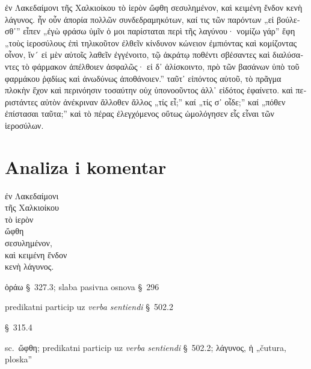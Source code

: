 {\large

\begin{greek}

\noindent ἐν Λακεδαίμονι τῆς Χαλκιοίκου τὸ ἱερὸν ὤφθη σεσυλημένον, καὶ κειμένη ἔνδον κενὴ λάγυνος. ἦν οὖν ἀπορία πολλῶν συνδεδραμηκότων, καί τις τῶν παρόντων „εἰ βούλεσθ᾽” εἶπεν „ἐγὼ φράσω ὑμῖν ὁ μοι παρίσταται περὶ τῆς λαγύνου· νομίζω γάρ” ἔφη „τοὺς ἱεροσύλους ἐπὶ τηλικοῦτον ἐλθεῖν κίνδυνον κώνειον ἐμπιόντας καὶ κομίζοντας οἶνον, ἵν´ εἰ μὲν αὐτοῖς λαθεῖν ἐγγένοιτο, τῷ ἀκράτῳ ποθέντι σβέσαντες καὶ διαλύσαντες τὸ φάρμακον ἀπέλθοιεν ἀσφαλῶς· εἰ δ᾽ ἁλίσκοιντο, πρὸ τῶν βασάνων ὑπὸ τοῦ φαρμάκου ῥᾳδίως καὶ ἀνωδύνως ἀποθάνοιεν.” ταῦτ᾽ εἰπόντος αὐτοῦ, τὸ πρᾶγμα πλοκὴν ἔχον καὶ περινόησιν τοσαύτην οὐχ ὑπονοοῦντος ἀλλ᾽ εἰδότος ἐφαίνετο. καὶ περιστάντες αὐτὸν ἀνέκριναν ἄλλοθεν ἄλλος „τίς εἶ;” καί „τίς σ᾽ οἶδε;” καί „πόθεν ἐπίστασαι ταῦτα;” καὶ τὸ πέρας ἐλεγχόμενος οὕτως ὡμολόγησεν εἷς εἶναι τῶν ἱεροσύλων.

\end{greek}

}


\section*{Analiza i komentar}


{\large
\begin{greek}
\noindent ἐν Λακεδαίμονι \\
\tabto{2em} τῆς Χαλκιοίκου \\
τὸ ἱερὸν \\
ὤφθη \\
σεσυλημένον, \\
καὶ κειμένη ἔνδον \\
κενὴ λάγυνος.\\
 
\end{greek}
}

\begin{description}[noitemsep]
\item[ὤφθη] ὁράω §~327.3; slaba pasivna osnova §~296
\item[σεσυλημένον] predikatni particip uz \textit{verba sentiendi} §~502.2
\item[κειμένη] §~315.4
\item[κειμένη\dots\ κενὴ λάγυνος] sc.\ ὤφθη; predikatni particip uz \textit{verba sentiendi} §~502.2; λάγυνος, ἡ „čutura, ploska”
\end{description}



